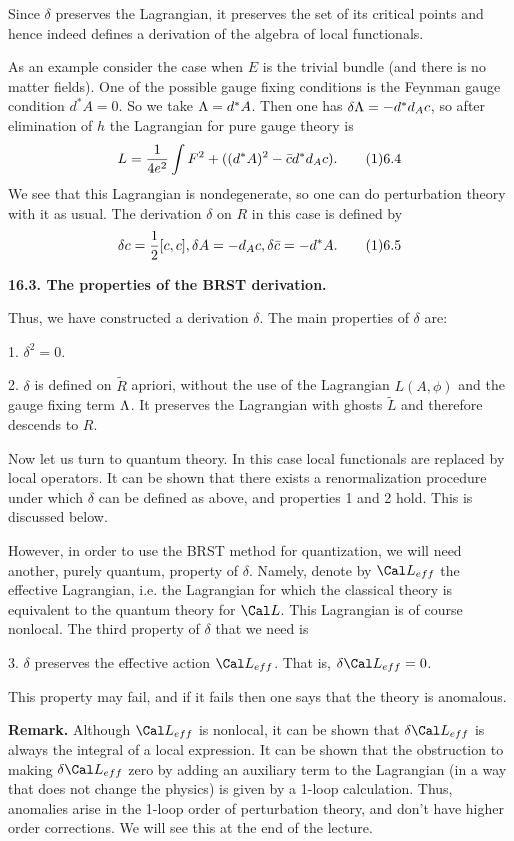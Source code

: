 Since $\delta$ preserves the Lagrangian,
 it preserves the set of its critical points
and hence indeed defines a derivation of the algebra of local functionals. 

As an example consider the case when $E$ is the trivial bundle
(and there is no matter fields). 
One of the possible gauge fixing conditions is the Feynman gauge condition 
$d^*A=0$. So we take $\Lambda=d^*A$. Then one has 
$\delta\Lambda=-d^*d_Ac$, so after elimination of $h$ the Lagrangian 
for pure gauge theory is
$$
L=\frac{1}{4e^2}\int F^2+((d^*A)^2-\bar cd^*d_Ac).\tag 16.4
$$
We see that this Lagrangian is nondegenerate, so one can do perturbation 
theory with it as usual. The derivation $\delta$ on $R$ in this case is 
defined by 
$$
\delta c=\frac{1}{2}[c,c], \delta A=-d_Ac, \delta\bar c=-d^*A.\tag 16.5
$$

{\bf 16.3. The properties of the BRST derivation.}

Thus, we have constructed a derivation $\delta$. The main
properties of $\delta$ are:

1. $\delta^2=0$. 

2. $\delta$ is defined on $\tilde R$ 
apriori, without the use of the Lagrangian $L(A,\phi)$
and the gauge fixing term $\Lambda$. 
It preserves the Lagrangian with ghosts $\tilde L$
and therefore descends to $R$. 

Now let us turn to quantum theory. In this case 
local functionals are replaced by local operators. It can be shown 
that there exists a renormalization procedure under which 
$\delta$ can be defined as above, and properties 1 and 2 hold. 
This is discussed below. 

However, in order to use the BRST method for quantization, 
we will need another, purely quantum, property of $\delta$. 
Namely, denote by $\Cal L_{eff}$ the effective Lagrangian, 
i.e. the Lagrangian for which the classical theory is equivalent 
to the quantum theory for $\Cal L$. This Lagrangian 
is of course nonlocal. 
The third property of 
$\delta$ that we need is

3. $\delta$ preserves the effective action
$\Cal L_{eff}$. That is, $\delta \Cal L_{eff}=0$. 

This property may fail, and if it fails then one says that the theory 
is anomalous. 

{\bf Remark.} Although $\Cal L_{eff}$ is nonlocal, it can be shown 
that $\delta\Cal L_{eff}$ is always the integral of a local 
expression. It can be shown that 
the obstruction to making $\delta\Cal L_{eff}$ zero 
by adding an auxiliary term to the Lagrangian (in a way that does not 
change the physics) is given by a 1-loop calculation. 
Thus, anomalies arise in the 1-loop order of perturbation 
theory, and don't have higher order corrections. 
We will see this at the end of the lecture. 

